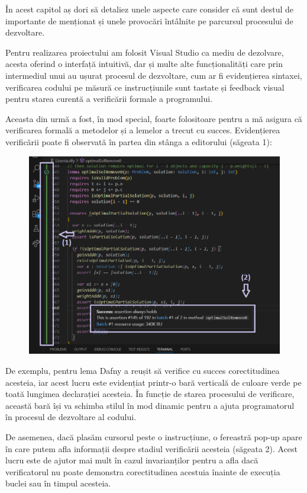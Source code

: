 \begin{sloppypar}
În acest capitol aș dori să detaliez unele aspecte care consider că sunt destul de importante de menționat și unele provocări întâlnite pe parcursul procesului de dezvoltare. \par
Pentru realizarea proiectului am folosit Visual Studio ca mediu de dezolvare, acesta oferind o interfață intuitivă, dar și multe alte funcționalități care prin intermediul unui  au ușurat procesul de dezvoltare, cum ar fi evidențierea sintaxei, verificarea codului pe măsură ce instrucțiunile sunt tastate și feedback visual pentru starea curentă a verificării formale a programului. \par
Aceasta din urmă a fost, în mod special, foarte folositoare pentru a mă asigura că verificarea formală a metodelor și a lemelor a trecut cu succes. Evidențierea verificării poate fi observată în partea din stânga a editorului (săgeata 1):
\begin{figure}[!ht]
    \centering
    \includegraphics[width=1.0\linewidth]{images/imageVerificationSucceeded.png}
\end{figure}
 \par De exemplu, pentru lema  Dafny a reușit să verifice cu succes corectitudinea acesteia, iar acest lucru este evidențiat printr-o bară verticală de culoare verde pe toată lungimea declarației acesteia. În funcție de starea procesului de verificare, această bară își va schimba stilul în mod dinamic pentru a ajuta programatorul în procesul de dezvoltare al codului.
 \par De asemenea, dacă plasăm cursorul peste o instrucțiune, o fereastră pop-up apare în care putem afla informații despre stadiul verificării acesteia (săgeata 2). Acest lucru este de ajutor mai mult în cazul invarianților pentru a afla dacă verificatorul nu poate demonstra corectitudinea acestuia înainte de execuția buclei sau în timpul acesteia. \\ \\ \par

\end{sloppypar}
